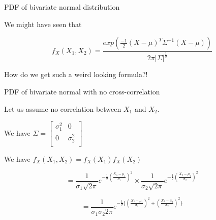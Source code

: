 \documentclass{beamer}
\begin{document}
\begin{frame}{PDF of bivariate normal distribution}

We might have seen that 

$$f_X(X_1, X_2) = \frac{exp(\frac{-1}{2}(X-\mu)^T \Sigma^{-1}(X-\mu))}{2\pi |\Sigma|^\frac{1}{2}}$$

How do we get such a weird looking formula?!

\end{frame}

\begin{frame}{PDF of bivariate normal with no cross-correlation}

Let us assume no correlation between $X_1$ and $X_2$.

We have $\Sigma = \begin{bmatrix}
\sigma_1^2 & 0 \\
0 & \sigma_2^2 \\
\end{bmatrix}$

We have $f_X(X_1, X_2) = f_X(X_1)f_X(X_2)$

$$=\frac{1}{\sigma_1 \sqrt{2\pi} } e^{-\frac{1}{2}\left(\frac{X_1-\mu_1}{\sigma_1}\right)^2} \times \frac{1}{\sigma_2 \sqrt{2\pi} } e^{-\frac{1}{2}\left(\frac{X_2-\mu_2}{\sigma_2}\right)^2}$$

$$= \frac{1}{\sigma_1 \sigma_2 2\pi } e^{-\frac{1}{2}\{\left(\frac{X_1-\mu_1}{\sigma_1}\right)^2 + \left(\frac{X_2-\mu_2}{\sigma_2}\right)^2 \}}  $$
\end{frame}
\end{document}
